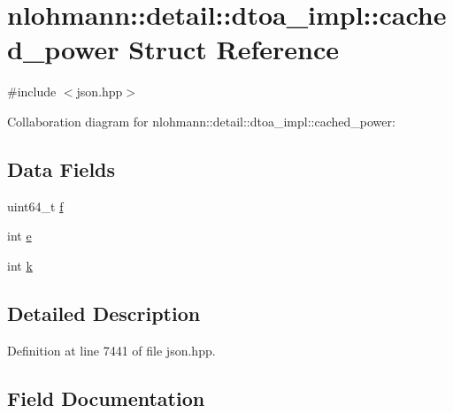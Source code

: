 \hypertarget{structnlohmann_1_1detail_1_1dtoa__impl_1_1cached__power}{}\section{nlohmann\+:\+:detail\+:\+:dtoa\+\_\+impl\+:\+:cached\+\_\+power Struct Reference}
\label{structnlohmann_1_1detail_1_1dtoa__impl_1_1cached__power}


{\ttfamily \#include $<$json.\+hpp$>$}



Collaboration diagram for nlohmann\+:\+:detail\+:\+:dtoa\+\_\+impl\+:\+:cached\+\_\+power\+:
\subsection*{Data Fields}
\begin{DoxyCompactItemize}
\item 
uint64\+\_\+t \hyperlink{structnlohmann_1_1detail_1_1dtoa__impl_1_1cached__power_a56a47ff88dce47986dd938f2ccb2abbf}{f}
\item 
int \hyperlink{structnlohmann_1_1detail_1_1dtoa__impl_1_1cached__power_a9e89bc89bb7bf4361f43ea27eed91d23}{e}
\item 
int \hyperlink{structnlohmann_1_1detail_1_1dtoa__impl_1_1cached__power_a8c1f2efed643eeaa8fae83c697a29c6a}{k}
\end{DoxyCompactItemize}


\subsection{Detailed Description}


Definition at line 7441 of file json.\+hpp.



\subsection{Field Documentation}
\mbox{\label{structnlohmann_1_1detail_1_1dtoa__impl_1_1cached__power_a9e89bc89bb7bf4361f43ea27eed91d23}} 
